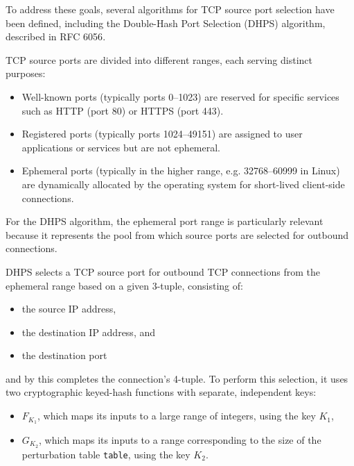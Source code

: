 \documentclass{report}
\begin{document}
To address these goals, several algorithms for TCP source port selection have been defined, including the \alert{Double-Hash Port Selection (DHPS)} algorithm, described in RFC 6056\cite{larsenRecommendationsTransportProtocolPort2011}. %

TCP source ports are divided into different ranges, each serving distinct purposes:
\begin{itemize}
	\item \alert{Well-known ports} (typically ports 0–1023) are reserved for specific services such as HTTP (port 80) or HTTPS (port 443).
	\item \alert{Registered ports} (typically ports 1024–49151) are assigned to user applications or services but are not ephemeral.
	\item \alert{Ephemeral ports} (typically in the higher range, e.g. 32768–60999 in Linux) are dynamically allocated by the operating system for short-lived client-side connections.
\end{itemize}

For the DHPS algorithm, the \alert{ephemeral port} range is particularly relevant because it represents the pool from which source ports are selected for outbound connections.

DHPS selects a TCP \alert{source port} for outbound TCP connections from the ephemeral range based on a given \alert{3-tuple}, consisting of:
\begin{itemize}
	\item the \alert{source IP} address,
	\item the \alert{destination IP} address, and
	\item the \alert{destination port}
\end{itemize}
and by this completes the connection’s \alert{4-tuple}. To perform this selection, it uses two \alert{cryptographic keyed-hash functions} with separate, independent keys:
\begin{itemize}
	\item \( F_{K_1} \), which maps its inputs to a large range of integers, using the key \( K_1 \),
	\item \( G_{K_2} \), which maps its inputs to a range corresponding to the size of the \alert{perturbation table} \texttt{table}, using the key \( K_2 \).
\end{itemize}
\end{document}
